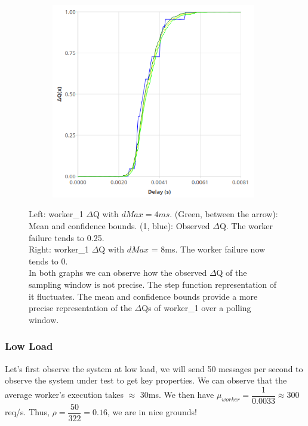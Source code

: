 \begin{figure}[H]
\begin{subfigure}{.5\textwidth}
                \includegraphics[width =0.98\textwidth]{img/overload_2/worker_1_8.png}
                \label{fig:w18}
            \end{subfigure}
            \label{fig:w1w2hb}
            \caption{Left: worker\_1 $\Delta$Q with $dMax = 4ms$. (Green, between the arrow): Mean and confidence bounds. (1, blue): Observed $\Delta$Q. The worker failure tends to 0.25. \\
            Right: worker\_1 $\Delta$Q with $dMax$ = 8ms. The worker failure now tends to 0. \\
            In both graphs we can observe how the observed $\Delta$Q of the sampling window is not precise. The step function representation of it fluctuates. The mean and confidence bounds provide a more precise representation of the $\Delta$Qs of worker\_1 over a polling window.}%
            \end{figure}
    \subsubsection{Low Load} 
    Let's first observe the system at low load, we will send 50 messages per second to observe the system under test to get key properties.
    We can observe that the average worker's execution takes $\approx$ 30ms. We then have $\mu_{worker} = \dfrac{1}{0.0033} \approx 300$ req/s. Thus, $\rho = \dfrac{50}{322} = 0.16$, we are in nice grounds!

